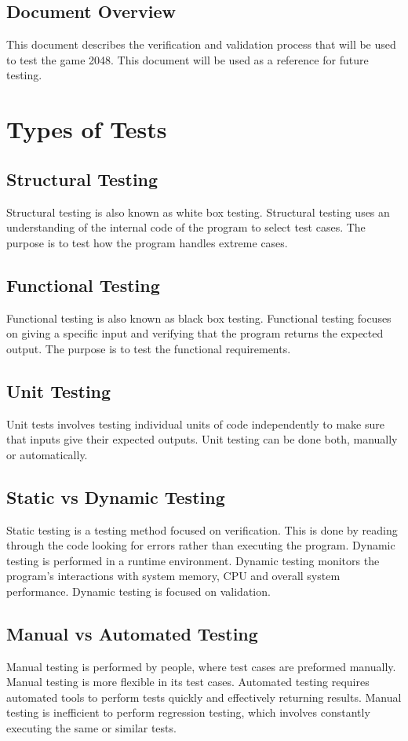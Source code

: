 \documentclass[12pt]{article}
\begin{document}
\subsection{Document Overview}
This document describes the verification and validation process that will be
used to test the game 2048. This document will be used as a reference for
future testing.

\section{Types of Tests}

\subsection{Structural Testing}
Structural testing is also known as white box testing. Structural testing
uses an understanding of the internal code of the program to select test cases.
The purpose is to test how the program handles extreme cases.

\subsection{Functional Testing}
Functional testing is also known as black box testing. Functional testing
focuses on giving a specific input and verifying that the program returns the
expected output. The purpose is to test the functional requirements.

\subsection{Unit Testing}
Unit tests involves testing individual units of code independently to make sure
that inputs give their expected outputs. Unit testing can be done both,
manually or automatically.

\subsection{Static vs Dynamic Testing}
Static testing is a testing method focused on verification. This is done by
reading through the code looking for errors rather than executing the program.
Dynamic testing is performed in a runtime environment. Dynamic testing monitors
the program's interactions with system memory, CPU and overall system
performance. Dynamic testing is focused on validation.

\subsection{Manual vs Automated Testing}
Manual testing is performed by people, where test cases are preformed manually.
Manual testing is more flexible in its test cases. Automated testing
requires automated tools to perform tests quickly and effectively returning
results. Manual testing is inefficient to perform regression testing, which
involves constantly executing the same or similar tests.
\end{document}
